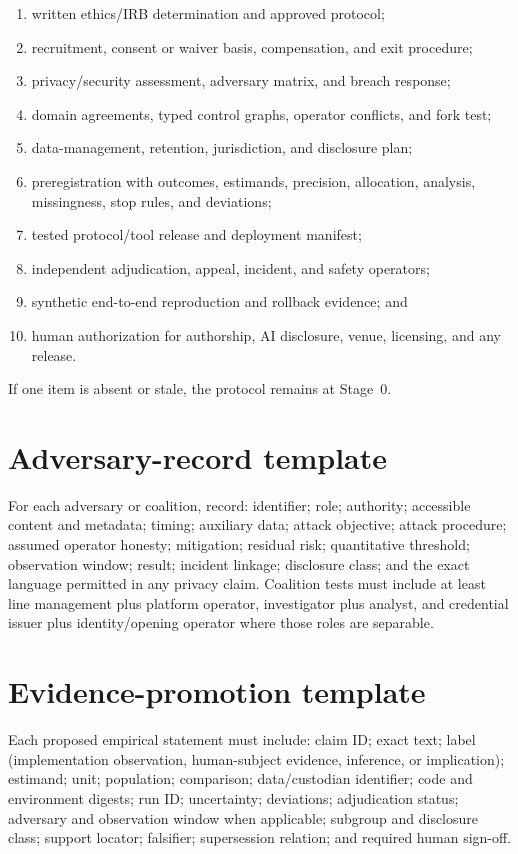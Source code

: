 \documentclass[11pt]{article}
\begin{document}
\begin{enumerate}
  \item written ethics/IRB determination and approved protocol;
  \item recruitment, consent or waiver basis, compensation, and exit procedure;
  \item privacy/security assessment, adversary matrix, and breach response;
  \item domain agreements, typed control graphs, operator conflicts, and fork test;
  \item data-management, retention, jurisdiction, and disclosure plan;
  \item preregistration with outcomes, estimands, precision, allocation, analysis,
  missingness, stop rules, and deviations;
  \item tested protocol/tool release and deployment manifest;
  \item independent adjudication, appeal, incident, and safety operators;
  \item synthetic end-to-end reproduction and rollback evidence; and
  \item human authorization for authorship, AI disclosure, venue, licensing, and
  any release.
\end{enumerate}

If one item is absent or stale, the protocol remains at Stage~0.

\section{Adversary-record template}

For each adversary or coalition, record: identifier; role; authority; accessible
content and metadata; timing; auxiliary data; attack objective; attack procedure;
assumed operator honesty; mitigation; residual risk; quantitative threshold;
observation window; result; incident linkage; disclosure class; and the exact
language permitted in any privacy claim. Coalition tests must include at least line
management plus platform operator, investigator plus analyst, and credential issuer
plus identity/opening operator where those roles are separable.

\section{Evidence-promotion template}

Each proposed empirical statement must include: claim ID; exact text; label
(implementation observation, human-subject evidence, inference, or implication);
estimand; unit; population; comparison; data/custodian identifier; code and
environment digests; run ID; uncertainty; deviations; adjudication status;
adversary and observation window when applicable; subgroup and disclosure class;
support locator; falsifier; supersession relation; and required human sign-off.



\end{document}
